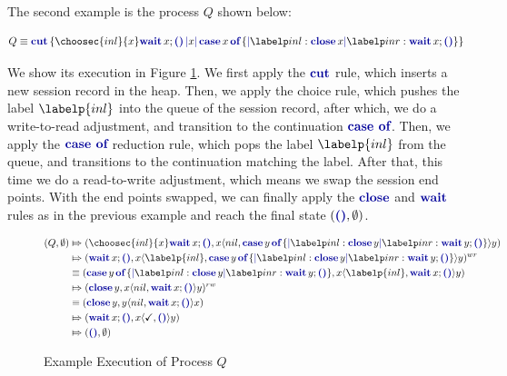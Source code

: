 The second example is the process $Q$ shown below:

$$
    Q \equiv
    \cutc{
        \choosec{inl}{x}
        \waitc{x}\emptyc
    }{x}{
        \casec{x}{
            \labelc{inl}{\closec{x}}
            \labelc{inr}{\waitc{x}\emptyc}
        }
    }
$$

We show its execution in Figure \ref{fig:SAMExampleExecutionQ}. We first apply the $\cutp$ rule, which inserts a new session record in the heap. Then, we apply the choice rule, which pushes the label $\labelp{inl}$ into the queue of the session record, after which, we do a write-to-read adjustment, and transition to the continuation $\casep$. Then, we apply the $\casep$ reduction rule, which pops the label $\labelp{inl}$ from the queue, and transitions to the continuation matching the label. After that, this time we do a read-to-write adjustment, which means we swap the session end points. With the end points swapped, we can finally apply the $\closep$ and $\waitp$ rules as in the previous example and reach the final state $(\emptyc, \emptyset)$.

\begin{figure}[H]
    \begin{align*}
        (Q, \emptyset)
         & \Mapsto
        (\choosec{inl}{x}\waitc{x}\emptyc, x\langle nil, \casec{y}{\labelc{inl}{\closec{y}}\labelc{inr}{\waitc{y}\emptyc}}\rangle y)          \\
         & \Mapsto (\waitc{x}\emptyc, x\langle \labelp{inl}, \casec{y}{\labelc{inl}{\closec{y}}\labelc{inr}{\waitc{y}\emptyc}}\rangle y)^{wr} \\
         & \equiv (\casec{y}{\labelc{inl}{\closec{y}}\labelc{inr}{\waitc{y}\emptyc}}, x\langle \labelp{inl}, \waitc{x}\emptyc\rangle y)       \\
         & \Mapsto (\closec{y}, x\langle nil, \waitc{x}\emptyc\rangle y)^{rw}                                                                 \\
         & \equiv (\closec{y}, y\langle nil, \waitc{x}\emptyc\rangle x)                                                                       \\
         & \Mapsto (\waitc{x}\emptyc, x\langle \checkmark, \emptyp\rangle y)                                                                  \\
         & \Mapsto (\emptyc, \emptyset)
    \end{align*}
    \caption{Example Execution of Process $Q$}
    \label{fig:SAMExampleExecutionQ}
\end{figure}

